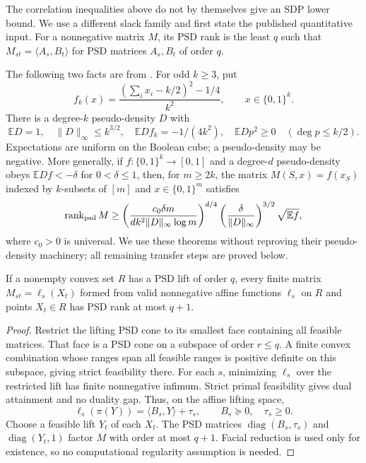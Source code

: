 The correlation inequalities above do not by themselves give an SDP lower
bound. We use a different slack family and first state the published
quantitative input. For a nonnegative matrix $M$, its PSD rank is the
least $q$ such that $M_{st}=\langle A_s,B_t\rangle$ for PSD matrices
$A_s,B_t$ of order $q$.

The following two facts are from
\citet[Theorem~5.3 and equation~(3.11), following Theorem~3.8]
{s6:lrs-full}. For odd $k\ge3$, put
\[
 f_k(x)=\frac{(\sum_i x_i-k/2)^2-1/4}{k^2},\qquad x\in\{0,1\}^k.
\]
There is a degree-$k$ pseudo-density $D$ with
\[
 \mathbb ED=1,\quad\|D\|_\infty\le k^{3/2},\quad
 \mathbb E Df_k=-1/(4k^2),\quad
 \mathbb E Dp^2\ge0\quad(\deg p\le k/2).
\]
Expectations are uniform on the Boolean cube; a pseudo-density may be
negative. More generally, if $f:\{0,1\}^k\to[0,1]$ and a degree-$d$
pseudo-density obeys $\mathbb EDf<-\delta$ for $0<\delta\le1$,
then, for $m\ge2k$,
the matrix $M(S,x)=f(x_S)$ indexed by $k$-subsets of $[m]$ and
$x\in\{0,1\}^m$ satisfies
\begin{equation}
 \operatorname{rank}_{\rm psd}M\ge
 \left(\frac{c_0\delta m}{dk^2\|D\|_\infty\log m}\right)^{d/4}
 \left(\frac{\delta}{\|D\|_\infty}\right)^{3/2}
 \sqrt{\mathbb Ef},\label{app:lrs-input}
\end{equation}
where $c_0>0$ is universal. We use these theorems without
reproving their pseudo-density machinery; all remaining transfer steps
are proved below.

\begin{lemma}\label{app:slack-factor}
If a nonempty convex set $R$ has a PSD lift of order $q$, every finite
matrix $M_{st}=\ell_s(X_t)$ formed from valid nonnegative affine
functions $\ell_s$ on $R$ and points $X_t\in R$ has PSD rank at most
$q+1$.
\end{lemma}
\begin{proof}
Restrict the lifting PSD cone to its smallest face containing all feasible
matrices. That face is a PSD cone on a subspace of order $r\le q$.
A finite convex combination whose ranges span all feasible ranges is
positive definite on this subspace, giving strict feasibility there.
For each $s$, minimizing $\ell_s$ over the restricted lift has finite
nonnegative infimum. Strict primal feasibility gives dual attainment
and no duality gap. Thus, on the affine lifting space,
\[
 \ell_s(\pi(Y))=\langle B_s,Y\rangle+\tau_s,
 \qquad B_s\succeq0,\quad\tau_s\ge0.
\]
Choose a feasible lift $Y_t$ of each $X_t$. The PSD matrices
$\operatorname{diag}(B_s,\tau_s)$ and
$\operatorname{diag}(Y_t,1)$ factor $M$ with order at most $q+1$.
Facial reduction is used only for existence, so no computational
regularity assumption is needed.
\end{proof}

